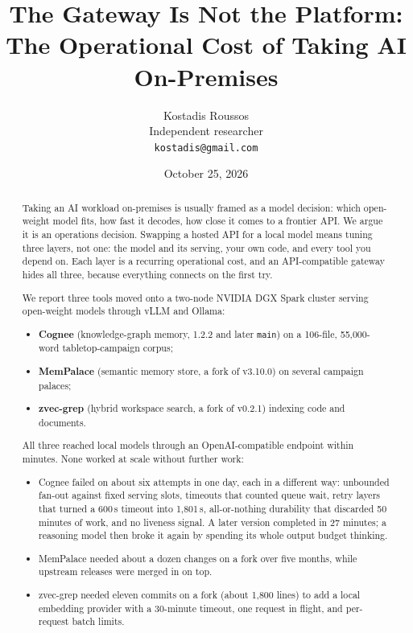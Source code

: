 \documentclass[11pt]{article}
\title{The Gateway Is Not the Platform:\\
The Operational Cost of Taking AI On-Premises}
\author{Kostadis Roussos\\
Independent researcher\\
\texttt{kostadis@gmail.com}}
\date{October 25, 2026}
\newcommand{\code}[1]{\texttt{#1}}
\begin{document}
\maketitle

\begin{abstract}
Taking an AI workload on-premises is usually framed as a model decision: which open-weight model
fits, how fast it decodes, how close it comes to a frontier API. We argue it is an operations
decision. Swapping a hosted API for a local model means tuning three layers, not one: the model and
its serving, your own code, and every tool you depend on. Each layer is a recurring operational
cost, and an API-compatible gateway hides all three, because everything connects on the first try.

We report three tools moved onto a two-node NVIDIA DGX Spark cluster serving open-weight models
through vLLM and Ollama:
\begin{itemize}
  \item \textbf{Cognee} (knowledge-graph memory, 1.2.2 and later \code{main}) on a 106-file,
    55,000-word tabletop-campaign corpus;
  \item \textbf{MemPalace} (semantic memory store, a fork of v3.10.0) on several campaign palaces;
  \item \textbf{zvec-grep} (hybrid workspace search, a fork of v0.2.1) indexing code and documents.
\end{itemize}

All three reached local models through an OpenAI-compatible endpoint within minutes. None worked at
scale without further work:
\begin{itemize}
  \item Cognee failed on about six attempts in one day, each in a different way: unbounded fan-out
    against fixed serving slots, timeouts that counted queue wait, retry layers that turned a
    600\,s timeout into 1,801\,s, all-or-nothing durability that discarded 50 minutes of work, and
    no liveness signal. A later version completed in 27 minutes; a reasoning model then broke it
    again by spending its whole output budget thinking.
  \item MemPalace needed about a dozen changes on a fork over five months, while upstream releases
    were merged in on top.
  \item zvec-grep needed eleven commits on a fork (about 1,800 lines) to add a local embedding
    provider with a 30-minute timeout, one request in flight, and per-request batch limits.
\end{itemize}


\end{abstract}
\end{document}
